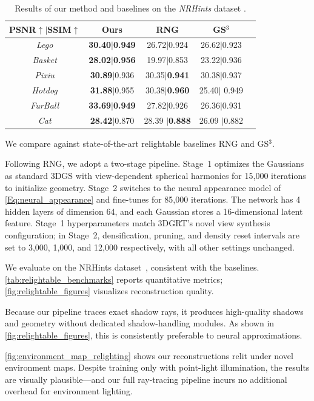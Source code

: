 \begin{table}[t]
	\caption{\label{tab:relightable_benchmarks}
		Results of our method and baselines on the \textsl{NRHints} dataset \cite{zeng2023nrhints}.
	}
	\centering
	\small
	\begin{tabular}{c|cccc}
		\toprule
		\footnotesize{PSNR$\uparrow$\;$|$\;SSIM$\uparrow$} & \textbf{Ours}                   & RNG                     & GS$^3$         \\
		\midrule
		\textsl{Lego}                                      & \textbf{30.40}$|$\textbf{0.949} & 26.72$|$0.924           & 26.62$|$0.923  \\
		\textsl{Basket}                                    & \textbf{28.02}$|$\textbf{0.956} & 19.97$|$0.853           & 23.22$|$0.936  \\
		\textsl{Pixiu}                                     & \textbf{30.89}$|$0.936          & 30.35$|$\textbf{0.941}  & 30.38$|$0.937  \\
		\textsl{Hotdog}                                    & \textbf{31.88}$|$0.955          & 30.38$|$\textbf{0.960}  & 25.40$|$ 0.949 \\
		\textsl{FurBall}                                   & \textbf{33.69}$|$\textbf{0.949} & 27.82$|$0.926           & 26.36$|$0.931  \\
		\textsl{Cat}                                       & \textbf{28.42}$|$0.870          & 28.39 $|$\textbf{0.888} & 26.09 $|$0.882 \\
		\bottomrule
	\end{tabular}
\end{table}

We compare against state-of-the-art relightable baselines RNG and GS$^3$.

Following RNG, we adopt a two-stage pipeline. Stage~1 optimizes the Gaussians as standard 3DGS with view-dependent spherical harmonics for 15,000 iterations to initialize geometry. Stage~2 switches to the neural appearance model of \autoref{Eq:neural_appearance} and fine-tunes for 85,000 iterations. The network has 4 hidden layers of dimension 64, and each Gaussian stores a 16-dimensional latent feature. Stage~1 hyperparameters match 3DGRT's novel view synthesis configuration; in Stage~2, densification, pruning, and density reset intervals are set to 3,000, 1,000, and 12,000 respectively, with all other settings unchanged.

We evaluate on the NRHints dataset~\cite{zeng2023nrhints}, consistent with the baselines. \autoref{tab:relightable_benchmarks} reports quantitative metrics; \autoref{fig:relightable_figures} visualizes reconstruction quality.

Because our pipeline traces exact shadow rays, it produces high-quality shadows and geometry without dedicated shadow-handling modules. As shown in \autoref{fig:relightable_figures}, this is consistently preferable to neural approximations.

\autoref{fig:environment_map_relighting} shows our reconstructions relit under novel environment maps. Despite training only with point-light illumination, the results are visually plausible---and our full ray-tracing pipeline incurs no additional overhead for environment lighting.
